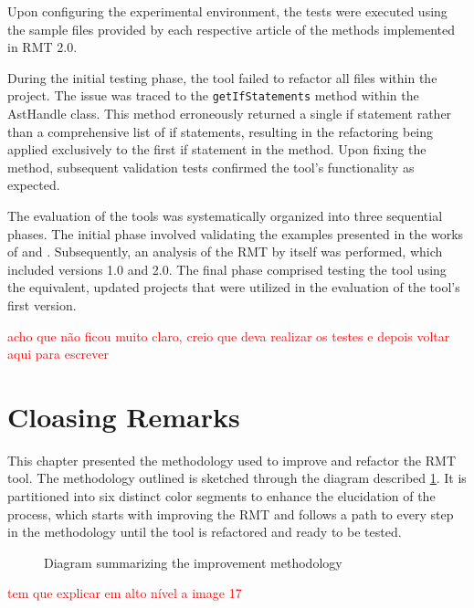 Upon configuring the experimental environment, the tests were executed using the sample files provided by each respective article of the methods implemented in RMT 2.0. 

During the initial testing phase, the tool failed to refactor all files within the project. The issue was traced to the \texttt{getIfStatements} method within the AstHandle class. This method erroneously returned a single if statement rather than a comprehensive list of if statements, resulting in the refactoring being applied exclusively to the first if statement in the \cite{liu2014automated} method. Upon fixing the method, subsequent validation tests confirmed the tool's functionality as expected.

The evaluation of the tools was systematically organized into three sequential phases. The initial phase involved validating the examples presented in the works of \textcite{liu2014automated} and \cite{zafeiris2017automated}. Subsequently, an analysis of the RMT by itself was performed, which included versions 1.0 and 2.0. The final phase comprised testing the tool using the equivalent, updated projects that were utilized in the evaluation of the tool's first version.

\textcolor{red}{acho que não ficou muito claro, creio que deva realizar os testes e depois voltar aqui para escrever}

\section{Cloasing Remarks}

This chapter presented the methodology used to improve and refactor the RMT tool. 
The methodology outlined is sketched through the diagram described \cref{fig-summarized-methodology}. It is partitioned into six distinct color segments to enhance the elucidation of the process, which starts with improving the RMT and follows a path to every step in the methodology until the tool is refactored and ready to be tested.

\begin{figure}[ht!]
\SetCaptionWidth{\textwidth}
\caption{Diagram summarizing the improvement methodology}
\label{fig-summarized-methodology}
\fontsize{3.8}{5}\selectfont

\end{figure}
\FloatBarrier

\textcolor{red}{tem que explicar em alto nível a image 17}